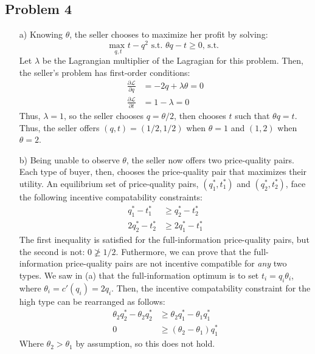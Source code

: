 \documentclass{article}
\newcommand{\usmax}[1]{\underset{#1}{\text{max }}}
\renewcommand{\L}{\mathcal{L}}
\begin{document}
\subsection*{Problem 4}

\begin{itemize}
	\item[a)] Knowing $\theta$, the seller chooses to maximize her profit by solving:
		\[
			\usmax{q,t}t-q^2\text{ s.t. }\theta q - t\geq 0\text{, s.t. } 
		\]
		Let $\lambda$ be the Lagrangian multiplier of the Lagragian for this problem. Then, the seller's problem has first-order conditions:
		\begin{align*}
			\frac{\partial\L}{\partial q} &= -2q + \lambda\theta = 0	\\
			\frac{\partial\L}{\partial t} &= 1 - \lambda = 0
		\end{align*}
		Thus, $\lambda=1$, so the seller chooses ${q=\theta/2}$, then chooses $t$ such that ${\theta q=t}$. Thus, the seller offers ${(q,t)=(1/2,1/2)}$ when ${\theta=1}$ and ${(1,2)}$ when ${\theta=2}$.
	
	\item[b)] Being unable to observe $\theta$, the seller now offers two price-quality pairs. Each type of buyer, then, chooses the price-quality pair that maximizes their utility. An equilibrium set of price-quality pairs, ${(q^*_1,t^*_1)}$ and ${(q^*_2,t^*_2)}$, face the following incentive compatability constraints:
		\begin{align*}
			q_1^* - t_1^* 	&\geq q_2^* - t_2^*		\\
			2q_2^* - t_2^* 	&\geq 2q_1^* - t_1^*
		\end{align*}
		The first inequality is satisfied for the full-information price-quality pairs, but the second is not: ${0\ngeq 1/2}$. Futhermore, we can prove that the full-information price-quality pairs are not incentive compatible for \textit{any} two types. We saw in (a) that the full-information optimum is to set ${t_i=q_i\theta_i}$, where ${\theta_i=c'(q_i)=2q_i}$. Then, the incentive compatability constraint for the high type can be rearranged as follows:
		\begin{align*}
			\theta_2q_2^* - \theta_2q_2^*		&\geq \theta_2q_1^* - \theta_1q_1^*	\\
			0						&\geq (\theta_2-\theta_1)q_1^*
		\end{align*}
		Where ${\theta_2>\theta_1}$ by assumption, so this does not hold.
	

\end{itemize}
\end{document}
